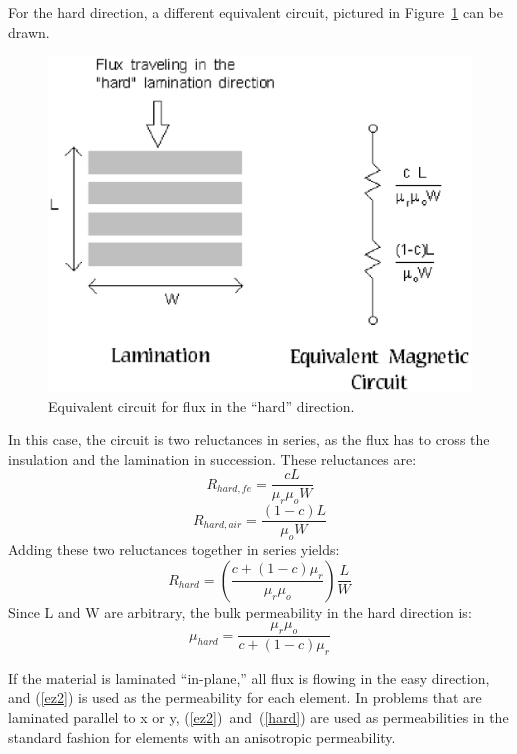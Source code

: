 \documentclass[12pt]{report}
\newcommand{\be}{\begin{equation}}
\newcommand{\ee}{\end{equation}}
\begin{document}
For the hard direction, a different equivalent circuit, pictured in
Figure~\ref{harddirection} can be drawn.
\begin{figure}
\centerline{\includegraphics{hardlam.ps}}
\caption{Equivalent circuit for flux in the ``hard'' direction.}
\label{harddirection}
\end{figure}
In this case, the circuit is two reluctances in series, as the flux
has to cross the insulation and the lamination in succession. These
reluctances are:
\be R_{hard,fe}=\frac{c L}{\mu_r \mu_o W} \ee
\be R_{hard,air}=\frac{(1-c) L}{\mu_o W} \ee
Adding these two reluctances together in series yields:
\be R_{hard}=\left( \frac{c+(1-c) \mu_r}{\mu_r \mu_o} \right)
\frac{L}{W} \ee
Since L and W are arbitrary, the bulk permeability in the hard
direction is:
\be \label{hard} \mu_{hard}=  \frac{\mu_r \mu_o}{c+(1-c) \mu_r} \ee

If the material is laminated ``in-plane,'' all flux is flowing in
the easy direction, and (\ref{ez2}) is used as the permeability for
each element.  In problems that are laminated parallel to x or y,
(\ref{ez2})~and~(\ref{hard}) are used as permeabilities in the
standard fashion for elements with an anisotropic permeability.
\end{document}

